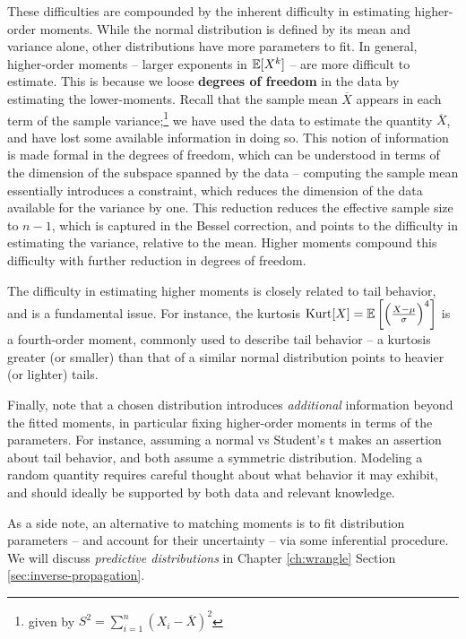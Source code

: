 \documentclass[../primer.tex]{subfiles}
\begin{document}
These difficulties are compounded by the inherent difficulty in estimating
higher-order moments. While the normal distribution is defined by its mean and
variance alone, other distributions have more parameters to fit. In general,
higher-order moments -- larger exponents in $\mathbb{E}[X^k]$ -- are more difficult to
estimate. This is because we loose \textbf{degrees of freedom} in the data by
estimating the lower-moments. Recall that the sample mean $\overline{X}$ appears
in each term of the sample variance;\footnote{given by $S^2 = \sum_{i=1}^n (X_i
  - \overline{X})^2$} we have used the data to estimate the quantity
$\overline{X}$, and have lost some available information in doing so. This
notion of information is made formal in the degrees of freedom, which can be
understood in terms of the dimension of the subspace spanned by the data --
computing the sample mean essentially introduces a constraint, which reduces the
dimension of the data available for the variance by one. This reduction reduces
the effective sample size to $n-1$, which is captured in the Bessel correction,
and points to the difficulty in estimating the variance, relative to the mean.
Higher moments compound this difficulty with further reduction in degrees of
freedom.

The difficulty in estimating higher moments is closely related to tail behavior,
and is a fundamental issue. For instance, the kurtosis $\text{Kurt}[X] =
\mathbb{E}\left[\left(\frac{X - \mu}{\sigma}\right)^4\right]$ is a fourth-order moment,
commonly used to describe tail behavior -- a kurtosis greater (or smaller) than
that of a similar normal distribution points to heavier (or lighter) tails.

Finally, note that a chosen distribution introduces \emph{additional}
information beyond the fitted moments, in particular fixing higher-order moments
in terms of the parameters. For instance, assuming a normal vs Student's t makes
an assertion about tail behavior, and both assume a symmetric distribution.
Modeling a random quantity requires careful thought about what behavior it may
exhibit, and should ideally be supported by both data and relevant knowledge.

As a side note, an alternative to matching moments is to fit distribution
parameters -- and account for their uncertainty -- via some inferential
procedure. We will discuss \emph{predictive distributions} in Chapter
\ref{ch:wrangle} Section \ref{sec:inverse-propagation}.
\end{document}
